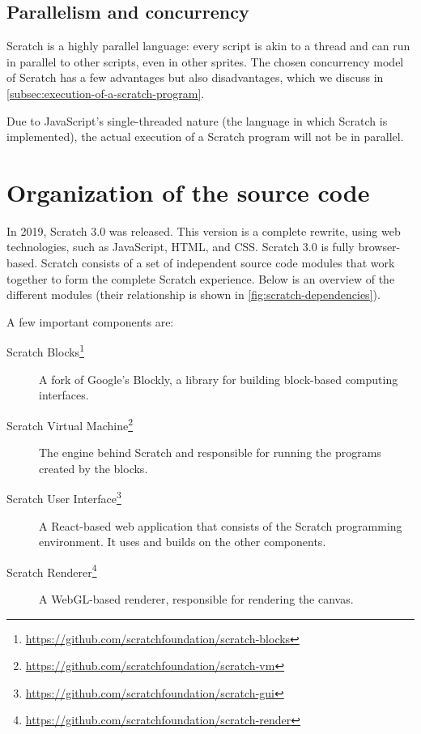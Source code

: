 \documentclass[../main]{subfiles}
\begin{document}
\subsection{Parallelism and concurrency}\label{subsec:parallelism}

Scratch is a highly parallel language: every script is akin to a thread and can run in parallel to other scripts, even in other sprites.
The chosen concurrency model of Scratch has a few advantages but also disadvantages, which we discuss in \cref{subsec:execution-of-a-scratch-program}.

Due to JavaScript's single-threaded nature (the language in which Scratch is implemented), the actual execution of a Scratch program will not be in parallel.

\section{Organization of the source code}\label{sec:scratch-internal}

In 2019, Scratch 3.0 was released.
This version is a complete rewrite, using web technologies, such as JavaScript, HTML, and CSS\@.
Scratch 3.0 is fully browser-based.
Scratch consists of a set of independent source code modules that work together to form the complete Scratch experience.
Below is an overview of the different modules (their relationship is shown in \cref{fig:scratch-dependencies}).

A few important components are:

\begin{description}
    \item[Scratch Blocks\footnote{\url{https://github.com/scratchfoundation/scratch-blocks}}] A fork of Google's Blockly, a library for building block-based computing interfaces.
    \item[Scratch Virtual Machine\footnote{\url{https://github.com/scratchfoundation/scratch-vm}}] The engine behind Scratch and responsible for running the programs created by the blocks.
    \item[Scratch User Interface\footnote{\url{https://github.com/scratchfoundation/scratch-gui}}] A React-based web application that consists of the Scratch programming environment. It uses and builds on the other components.
    \item[Scratch Renderer\footnote{\url{https://github.com/scratchfoundation/scratch-render}}] A WebGL-based renderer, responsible for rendering the canvas.
\end{description}
\end{document}
